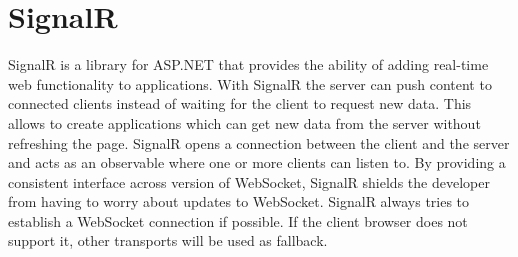 \autocite{Buomprisco2019}

\section{SignalR}
SignalR is a library for ASP.NET that provides the ability of adding real-time web functionality to applications. With SignalR the server can push content to connected clients instead of waiting for the client to request new data. This allows to create applications which can get new data from the server without refreshing the page. SignalR opens a connection between the client and the server and acts as an observable where one or more clients can listen to. By providing a consistent interface across version of WebSocket, SignalR shields the developer from having to worry about updates to WebSocket. SignalR always tries to establish a WebSocket connection if possible. If the client browser does not support it, other transports will be used as fallback.
\autocite{Microsoft2014}